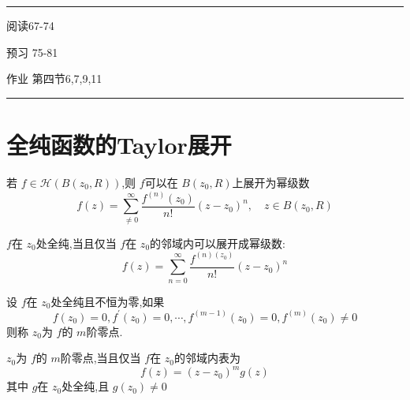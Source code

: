 \documentclass[../../复变函数.tex]{subfiles}
\begin{document}
\hspace*{\fill} 
\hrule
\hspace*{\fill}

阅读67-74

预习 75-81

作业 第四节6,7,9,11


\hspace*{\fill} 
\hrule
\hspace*{\fill}

\section{全纯函数的Taylor展开}

\begin{theorem}
    若 \(  f \in \mathcal{H}\left( B\left( z_0,R \right)  \right)   \),则 \(  f  \)可以在 \(  B\left( z_0,R \right)   \)上展开为幂级数 \[
    f\left( z \right) =  \sum _{ \neq 0}^{\infty} \frac{f^{\left( n \right) }\left( z_0 \right)  }{n! }\left( z-z_0 \right)^{n},\quad z\in B\left( z_0,R \right)    
    \] 
\end{theorem}

\begin{theorem}
     \(  f  \)在 \(  z_0   \)处全纯,当且仅当 \(  f  \)在 \(  z_0  \)的邻域内可以展开成幂级数: \[
     f\left( z \right)=  \sum _{ n = 0}^{\infty} \frac{f^{\left( n \right)\left( z_0 \right)  } }{n! }\left( z-z_0 \right)^{n}   
     \]    
\end{theorem}

\begin{definition}
    设 \(  f  \)在 \(  z_0  \)处全纯且不恒为零,如果 \[
    f\left( z_0 \right)= 0,f^{\prime} \left( z_0 \right)= 0,\cdots ,f^{\left( m-1 \right) }\left( z_0 \right)= 0, f^{\left( m \right) }\left( z_0 \right)\neq 0    
    \]则称 \(  z_0  \)为 \(  f  \)的 \(  m  \)阶零点.

\end{definition}

\begin{theorem}
    \(  z_0  \)为 \(  f  \)的 \(  m  \)阶零点,当且仅当 \(  f  \)在 \(  z_0  \)的邻域内表为 \[
    f\left( z \right)= \left( z-z_0 \right)^{m}g\left( z \right)   
    \]其中 \(  g  \)在 \(  z_0  \)处全纯,且 \(  g\left( z_0 \right)\neq 0   \)        
\end{theorem}
\end{document}
